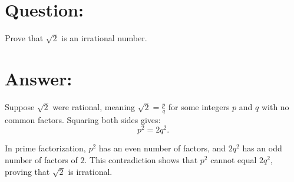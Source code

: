 \documentclass{article}
\begin{document}
\section{Question:}

Prove that $\sqrt{2}$ is an irrational number.

\section{Answer:}

Suppose $\sqrt{2}$ were rational, meaning $\sqrt{2} = \frac{p}{q}$ for some integers $p$ and $q$ with no common factors. Squaring both sides gives:
\begin{equation}
    p^2 = 2q^2.
\end{equation}

In prime factorization, $p^2$ has an even number of factors, and $2q^2$ has an odd number of factors of $2$. This contradiction shows that $p^2$ cannot equal $2q^2$, proving that $\sqrt{2}$ is irrational.
\end{document}
